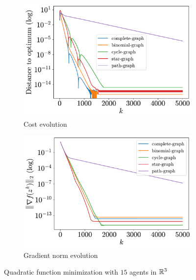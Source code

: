 \documentclass[a4paper,11pt,oneside]{book}
\begin{document}
\begin{figure}[tb!]
      \centering
      \begin{subfigure}[t]{0.46\linewidth}
            \centering
            \includegraphics[width=\linewidth]{./figs/quadratic/15_3/distance.pdf} 
            \caption{Cost evolution}
      \end{subfigure}
      \hfill
      \begin{subfigure}[t]{0.46\linewidth}
            \centering
            \includegraphics[width=\linewidth]{./figs/quadratic/15_3/gradient.pdf} 
            \caption{Gradient norm evolution}
      \end{subfigure}
      \caption{Quadratic function minimization with $15$ agents in ${\mathbb{R}}^{3}$}
      \label{fig:quadratic_15_3}
\end{figure}
\end{document}
